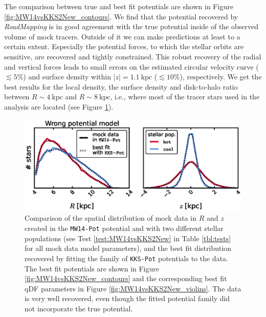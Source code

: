 \documentclass[iop,revtex4,numberedappendix,appendixfloats]{emulateapj}
\newcommand{\RM}{{\sl RoadMapping}}
\begin{document}
The comparison between true and best fit potentials are shown in Figure \ref{fig:MW14vsKKS2New_contours}. We find that the potential recovered by \RM{} is in good agreement with the true potential inside of the observed volume of mock tracers. Outside of it we can make predictions at least to a certain extent. Especially the potential forces, to which the stellar orbits are sensitive, are recovered and tightly constrained. This robust recovery of the radial and vertical forces leads to small errors on the estimated circular velocity curve ($\lesssim 5\%$) and surface density within $|z| = 1.1~\text{kpc}$ ($\lesssim 10\%$), respectively. We get the best results for the local density, the surface density and disk-to-halo ratio between $R\sim4~\text{kpc}$ and $R\sim8~\text{kpc}$, i.e., where most of the tracer stars used in the analysis are located (see Figure \ref{fig:MW14vsKKS2New_mockdata_residuals}).

\begin{figure}[!htbp]
\centering
\includegraphics[width=\columnwidth]{MW14vsKKS2New_mockdata_residuals.eps}
\caption{Comparison of the spatial distribution of mock data in $R$ and $z$ created in the \texttt{MW14-Pot} potential and with two different stellar populations (see Test \ref{test:MW14vsKKS2New} in Table \ref{tbl:tests} for all mock data model parameters), and the best fit distribution recovered by fitting the family of \texttt{KKS-Pot} potentials to the data. The best fit potentials are shown in Figure \ref{fig:MW14vsKKS2New_contours} and the corresponding best fit qDF parameters in Figure \ref{fig:MW14vsKKS2New_violins}. The data is very well recovered, even though the fitted potential family did not incorporate the true potential.}
\label{fig:MW14vsKKS2New_mockdata_residuals}
\end{figure}
\end{document}
